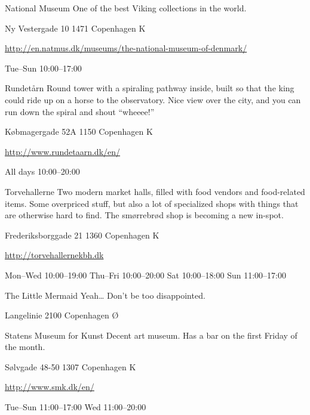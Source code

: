 \begin{funitem}
{National Museum}
{One of the best Viking collections in the world.}
{\begin{addr}
{Ny Vestergade 10}
{1471 Copenhagen K}
\end{addr}}
{\url{http://en.natmus.dk/museums/the-national-museum-of-denmark/}}
{\begin{ohours}
{Tue–Sun}
{10:00–17:00}
{}
{}
{}
{}
{}
{}
\end{ohours}}
\end{funitem}
\begin{funitem}
{Rundetårn}
{Round tower with a spiraling pathway inside, built so that the king could ride up on a horse to the observatory. Nice view over the city, and you can run down the spiral and shout “wheeee!” }
{\begin{addr}
{Købmagergade 52A}
{1150 Copenhagen K}
\end{addr}}
{\url{http://www.rundetaarn.dk/en/}}
{\begin{ohours}
{All days}
{10:00–20:00}
{}
{}
{}
{}
{}
{}
\end{ohours}}
\end{funitem}
\begin{funitem}
{Torvehallerne}
{Two modern market halls, filled with food vendors and food-related items. Some overpriced stuff, but also a lot of specialized shops with things that are otherwise hard to find. The smørrebrød shop is becoming a new in-spot.}
{\begin{addr}
{Frederiksborggade 21}
{1360 Copenhagen K}
\end{addr}}
{\url{http://torvehallernekbh.dk}}
{\begin{ohours}
{Mon–Wed}
{10:00–19:00}
{Thu–Fri}
{10:00–20:00}
{Sat}
{10:00–18:00}
{Sun}
{11:00–17:00}
\end{ohours}}
\end{funitem}
\begin{funitemwourl}
{The Little Mermaid}
{Yeah… Don’t be too disappointed.}
{\begin{addr}
{Langelinie}
{2100 Copenhagen Ø}
\end{addr}}
{}
{\begin{ohours}
{}
{}
{}
{}
{}
{}
{}
{}
\end{ohours}}
\end{funitemwourl}
\begin{funitem}
{Statens Museum for Kunst}
{Decent art museum. Has a bar on the first Friday of the month.}
{\begin{addr}
{Sølvgade 48-50}
{1307 Copenhagen K}
\end{addr}}
{\url{http://www.smk.dk/en/}}
{\begin{ohours}
{Tue–Sun}
{11:00–17:00}
{Wed}
{11:00–20:00}
{}
{}
{}
{}
\end{ohours}}
\end{funitem}

